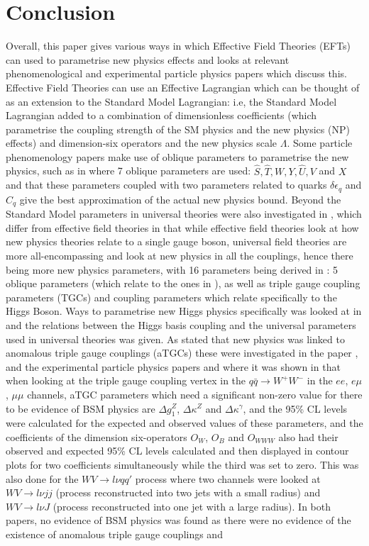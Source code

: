 \documentclass[11pt,oneside,a4paper]{article}
\begin{document}
\section{Conclusion}
Overall, this paper gives various ways in which Effective Field Theories (EFTs) can used to parametrise new physics effects and looks at relevant phenomenological and experimental particle physics papers which discuss this. Effective Field Theories can use an Effective Lagrangian which can be thought of as an extension to the Standard Model Lagrangian: i.e, the Standard Model Lagrangian added to a combination of dimensionless coefficients (which parametrise the coupling strength of the SM physics and the new physics (NP) effects) and dimension-six operators and the new physics scale $\Lambda$. Some particle phenomenology papers make use of oblique parameters to parametrise the new physics, such as in \cite{EWprecision} where 7 oblique parameters are used: $\hat{S}, \hat{T}, W, Y, \hat{U}, V$ and $X$ and that these parameters coupled with two parameters related to quarks $\delta\epsilon_{q}$ and $C_{q}$ give the best approximation of the actual new physics bound. Beyond the Standard Model parameters in universal theories were also investigated in \cite{universal}, which differ from effective field theories in that while effective field theories look at how new physics theories relate to a single gauge boson, universal field theories are more all-encompassing and look at new physics in all the couplings, hence there being more new physics parameters, with 16 parameters being derived in \cite{universal}: 5 oblique parameters (which relate to the ones in \cite{EWprecision}), as well as triple gauge coupling parameters (TGCs) and coupling parameters which relate specifically to the Higgs Boson. Ways to parametrise new Higgs physics specifically was looked at in \cite{higgsbasis} and the relations between the Higgs basis coupling and the universal parameters used in universal theories was given. As \cite{higgsbasis} stated that new physics was linked to anomalous triple gauge couplings (aTGCs) these were investigated in the paper \cite{higgsdata}, and the experimental particle physics papers \cite{WWtgc} and \cite{WV} where it was shown in \cite{WWtgc} that when looking at the triple gauge coupling vertex in the $q\bar{q} \rightarrow W^{+}W^{-}$ in the $ee$, $e\mu$, $\mu\mu$ channels, aTGC parameters which need a significant non-zero value for there to be evidence of BSM physics are $\Delta g^{Z}_{1}$, $\Delta\kappa^{Z}$ and $\Delta\kappa^{\gamma}$, and the 95\% CL levels were calculated for the expected and observed values of these parameters, and the coefficients of the dimension six-operators $O_{W}$, $O_{B}$ and $O_{WWW}$ also had their observed and expected 95\% CL levels calculated and then displayed in contour plots for two coefficients simultaneously while the third was set to zero. This was also done for the $WV \rightarrow l\nu qq'$ process where two channels were looked at  $WV \rightarrow l\nu jj$ (process reconstructed into two jets with a small radius) and $WV \rightarrow l\nu J$ (process reconstructed into one jet with a large radius). In both papers, no evidence of BSM physics was found as there were no evidence of the existence of anomalous triple gauge couplings and 
\end{document}
